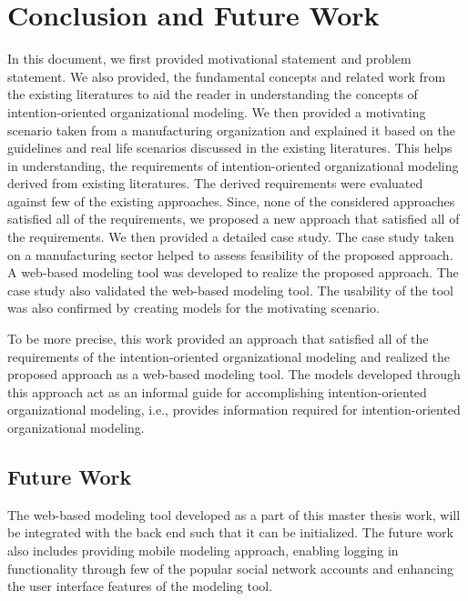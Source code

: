 \chapter{Conclusion and Future Work}
\label{chap:conclusion}

In this document, we first provided motivational statement and problem statement. We also provided, the fundamental concepts and related work from the existing literatures to aid the reader in understanding the concepts of intention-oriented organizational modeling. We then provided a motivating scenario taken from a manufacturing organization and explained it based on the guidelines and real life scenarios discussed in the existing literatures. This helps in understanding, the requirements of intention-oriented organizational modeling derived from existing literatures. The derived requirements were evaluated against few of the existing approaches. Since, none of the considered approaches satisfied all of the requirements, we proposed a new approach that satisfied all of the requirements. We then provided a detailed case study. The case study taken on a manufacturing sector helped to assess feasibility of the proposed approach. A web-based modeling tool was developed to realize the proposed approach. The case study also validated the web-based modeling tool. The usability of the tool was also confirmed by creating models for the motivating scenario.  

To be more precise, this work provided an approach that satisfied all of the requirements of the intention-oriented organizational modeling and realized the proposed approach as a web-based modeling tool. The models developed through this approach act as an informal guide for accomplishing intention-oriented organizational modeling, i.e., provides information required for intention-oriented organizational modeling. 

\section*{Future Work}
\label{sec:futurework}
The web-based modeling tool developed as a part of this master thesis work, will be integrated with the back end such that it can be initialized. The future work also includes providing mobile modeling approach, enabling logging in functionality through few of the popular social network accounts and enhancing the user interface features of the modeling tool. 





